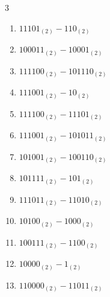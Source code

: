 \begin{multicols}{3}
\begin{enumerate}

  \item $11101_{(2)} - 110_{(2)}$


  \item $100011_{(2)} - 10001_{(2)}$


  \item $111100_{(2)} - 101110_{(2)}$


\columnbreak %

  \item $111001_{(2)} - 10_{(2)}$


  \item $111100_{(2)} - 11101_{(2)}$


  \item $111001_{(2)} - 101011_{(2)}$


  \item $101001_{(2)} - 100110_{(2)}$


  \item $101111_{(2)} - 101_{(2)}$


  \item $111011_{(2)} - 11010_{(2)}$


  \item $10100_{(2)} - 1000_{(2)}$


  \item $100111_{(2)} - 1100_{(2)}$


  \item $10000_{(2)} - 1_{(2)}$


  \item $110000_{(2)} - 11011_{(2)}$



\end{enumerate}
\end{multicols}
